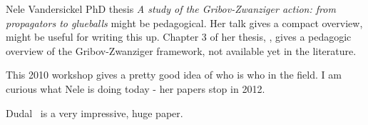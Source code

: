 \begin{description}
Nele Vandersickel PhD thesis {\em A study of the
Gribov-Zwanziger action: from propagators to glueballs} might be
pedagogical. Her
{talk} gives a compact overview, might be useful for writing this up.
Chapter 3 of her thesis, , gives a
pedagogic overview of the Gribov-Zwanziger framework, not available yet
in the literature.

This 2010  {workshop}
gives a pretty good idea of who is who in the field. I am curious what
Nele is doing today - 
{her papers} stop in 2012.

Dudal~\etal{} is a very impressive, huge paper.


\end{description}
\renewcommand{\ssp}{a}
